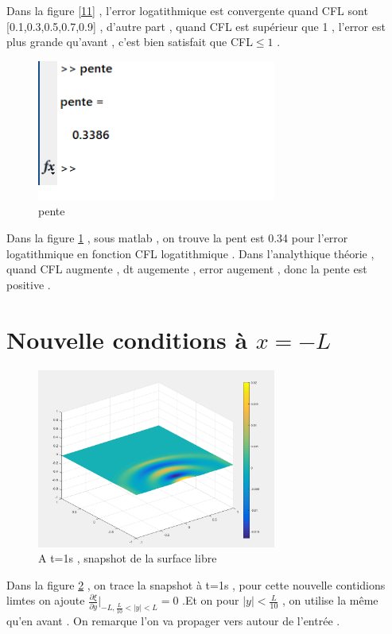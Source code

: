 \documentclass[a4paper,10pt]{report} %
\begin{document}
Dans la figure \ref{11} , l'error logatithmique est convergente quand CFL sont [0.1,0.3,0.5,0.7,0.9] , d'autre part , quand CFL est supérieur que 1 , l'error est plus grande qu'avant , c'est bien satisfait que CFL$\leq 1$ .

\begin{figure}[h]
\centering
\includegraphics[width=0.7\textwidth]{fig/figure13.png}
\caption{pente}
\label{13}
\end{figure}

Dans la figure \ref{13} , sous matlab , on trouve la pent est 0.34 pour l'error logatithmique en fonction CFL logatithmique . Dans l'analythique théorie , quand CFL augmente , dt augemente , error augement , donc la pente est positive .  

\section{Nouvelle conditions à $x=-L$}
\begin{figure}[h]
\centering
\includegraphics[width=0.7\textwidth]{fig/figure2.png}
\caption{A t=1s , snapshot de la surface libre}
\label{2}
\end{figure}
Dans la figure \ref{2} , on trace la snapshot à t=1s , pour cette nouvelle contidions limtes on ajoute $\frac{\partial \xi}{\partial y}\Big|_{-L,\frac{L}{10}<|y|<L}=0$ .Et on pour $|y|<\frac{L}{10}$ , on utilise la même qu'en avant .
On remarque l'on va propager vers autour de l'entrée .\\\\\\\\
\end{document}
